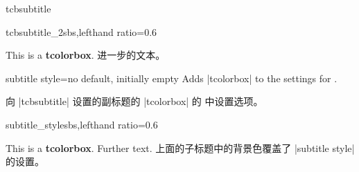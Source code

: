 \begin{docCommand}[doc new=2014-10-10]{tcbsubtitle}{}





\begin{exdispExample*}{tcbsubtitle_2}{sbs,lefthand ratio=0.6}
\begin{tcolorbox}[title=My title,
    colback=red!5!white,
    colframe=red!75!black,
    colbacktitle=yellow!50!red,
    coltitle=red!25!black,
    fonttitle=\bfseries]
  This is a \textbf{tcolorbox}.
进一步的文本。
\end{tcolorbox}
\end{exdispExample*}
\end{docCommand}

\begin{docTcbKey}[][doc new=2014-10-10]{subtitle style}{=}{no default, initially empty}
Adds |tcolorbox|  to the settings for .

向 |tcbsubtitle| 设置的副标题的 |tcolorbox| 的  中设置选项。

\begin{exdispExample*}{subtitle_style}{sbs,lefthand ratio=0.6}
\begin{tcolorbox}[title=My title,
  colback=red!5!white,
  colframe=red!75!black,
  colbacktitle=yellow!50!red,
  coltitle=red!25!black,
  fonttitle=\bfseries,
  subtitle style={boxrule=0.4pt,
    colback=yellow!50!red!25!white} ]
  This is a \textbf{tcolorbox}.
  Further text.
上面的子标题中的背景色覆盖了 |subtitle style| 的设置。
\end{tcolorbox}
\end{exdispExample*}
\end{docTcbKey}
